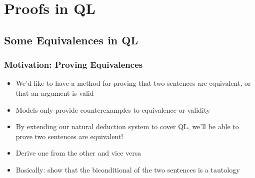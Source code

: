 ﻿%

\setlength{\columnsep}{2cm} %

\setcounter{section}{9}


\section{Proofs in QL}

\begin{frame}

\scriptsize{\tableofcontents}

\end{frame}

\subsection{Some Equivalences in QL}

\begin{frame}
\frametitle{Motivation: Proving Equivalences}

\begin{itemize}[<+->]

\item We'd like to have a method for proving that two sentences are equivalent, or that an argument is valid 

\item Models only provide counterexamples to equivalence or validity

\item By extending our natural deduction system to cover QL, we'll be able to prove two sentences are equivalent! 

\bi

\item Derive one from the other and vice versa

\item Basically: show that the biconditional of the two sentences is a tautology 

\ei


\end{itemize}
\end{frame}

